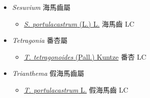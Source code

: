 
  \begin{itemize}
 \item[] \textit{Sesuvium} 海馬齒屬
                    
  \begin{itemize}
        \item[] \href{http://www.theplantlist.org/tpl1.1/search?q=Sesuvium+portulacastrum}{\textit{S. portulacastrum} (L.) L.}   海馬齒 LC
  \end{itemize}
 \item[] \textit{Tetragonia} 番杏屬
                    
  \begin{itemize}
        \item[] \href{http://www.theplantlist.org/tpl1.1/search?q=Tetragonia+tetragonoides}{\textit{T. tetragonoides} (Pall.) Kuntze}   番杏 LC
  \end{itemize}
 \item[] \textit{Trianthema} 假海馬齒屬
                    
  \begin{itemize}
        \item[] \href{http://www.theplantlist.org/tpl1.1/search?q=Trianthema+portulacastrum}{\textit{T. portulacastrum} L.}   假海馬齒 LC
  \end{itemize}
  \end{itemize}
